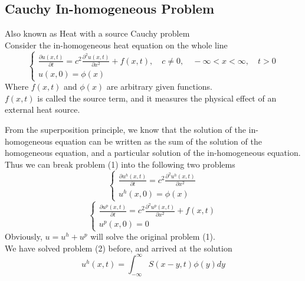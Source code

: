 \documentclass[]{article}
\begin{document}
\setcounter{equation}{0}
\subsection{Cauchy In-homogeneous Problem}
Also known as Heat with a source Cauchy problem
\\
Consider the in-homogeneous heat equation on the whole line
\begin{equation}
    \begin{cases}
        \displaystyle \frac{\partial u\left(x,t \right)}{\partial t} = c^2 \frac{\partial^2 u(x,t)}{\partial x^2} + f(x,t),\quad c\neq 0,\quad-\infty<x<\infty,\quad t>0
        \\
        u\left(x,0 \right) = \phi\left(x\right)
    \end{cases}
\end{equation}
Where $f(x, t)$ and $\phi(x)$ are arbitrary given functions. 
\\$f(x, t)$ is called the source term, and it measures the physical effect of an external heat source.
\par
From the superposition principle, we know that the solution of the in-homogeneous equation can
be written as the sum of the solution of the homogeneous equation, and a particular solution of the
in-homogeneous equation. 
\\
Thus we can break problem (1) into the following two problems
\begin{equation}
    \begin{cases}
        \displaystyle \frac{\partial u^h\left(x,t \right)}{\partial t} = c^2 \frac{\partial^2 u^h(x,t)}{\partial x^2}
        \\
        u^h\left(x,0 \right) = \phi\left(x\right)
    \end{cases}
\end{equation}
\begin{equation}
    \begin{cases}
        \displaystyle \frac{\partial u^p\left(x,t \right)}{\partial t} = c^2 \frac{\partial^2 u^p(x,t)}{\partial x^2}+ f(x,t)
        \\
        u^p\left(x,0 \right) = 0
    \end{cases}
\end{equation}
Obviously, $u = u^h + u^p$ will solve the original problem (1).
\\
We have solved problem (2) before, and arrived at the solution
\begin{equation}
    u^h(x,t) = \int_{-\infty}^{\infty}S(x-y,t) \phi(y)dy        
\end{equation}
\end{document}
